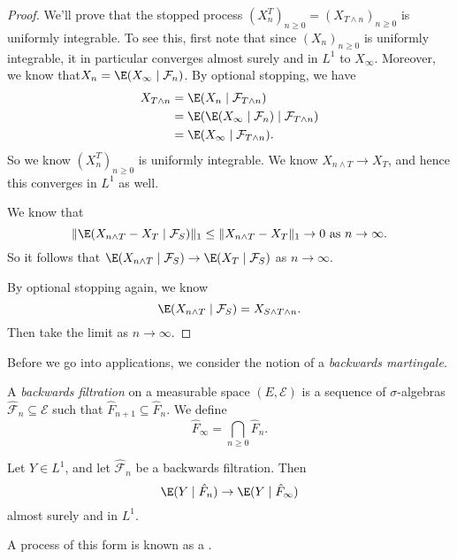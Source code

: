\documentclass[a4paper]{article}
\begin{document}
\begin{proof}
  We'll prove that the stopped process $(X^T_n)_{n \geq 0} = (X_{T \wedge n})_{n \geq 0}$ is uniformly integrable. To see this, first note that since $(X_n)_{n \geq 0}$ is uniformly integrable, it in particular converges almost surely and in $L^1$ to $X_\infty$. Moreover, we know that$X_n = \E(X_\infty \mid \mathcal{F}_n)$. By optional stopping, we have
  \begin{align*}
    X_{T\wedge n} &= \E(X_n \mid \mathcal{F}_{T \wedge n})\\
    &= \E(\E(X_\infty \mid \mathcal{F}_n) \mid \mathcal{F}_{T \wedge n})\\
    &= \E(X_\infty \mid \mathcal{F}_{T \wedge n}).
  \end{align*}
  So we know $(X_n^T)_{n \geq 0}$ is uniformly integrable. We know $X_{n \wedge T} \to X_T$, and hence this converges in $L^1$ as well.

  We know that
  \[
    \|\E(X_{n \wedge T} - X_T \mid \mathcal{F}_S)\|_1 \leq \|X_{n \wedge T} - X_T \|_1 \to 0\text{ as }n \to \infty.
  \]
  So it follows that $\E(X_{n \wedge T} \mid \mathcal{F}_S) \to \E(X_T \mid \mathcal{F}_S)$ as $n \to \infty$.

  By optional stopping again, we know
  \[
    \E(X_{n \wedge T} \mid \mathcal{F}_S) = X_{S \wedge T \wedge n}.
  \]
  Then take the limit as $n \to \infty$.
\end{proof}

Before we go into applications, we consider the notion of a \emph{backwards martingale}.
\begin{defi}
  A \emph{backwards filtration} on a measurable space $(E, \mathcal{E})$ is a sequence of $\sigma$-algebras $\hat{\mathcal{F}}_n \subseteq \mathcal{E}$ such that $\hat{F}_{n + 1} \subseteq \hat{F}_n$. We define
  \[
    \hat{F}_\infty = \bigcap_{n \geq 0} \hat{F}_n.
  \]
\end{defi}

\begin{thm}
  Let $Y \in L^1$, and let $\hat{\mathcal{F}}_n$ be a backwards filtration. Then
  \[
    \E(Y \mid \hat{F}_n) \to \E(Y \mid \hat{F}_\infty)
  \]
  almost surely and in $L^1$.
\end{thm}
A process of this form is known as a .
\end{document}
